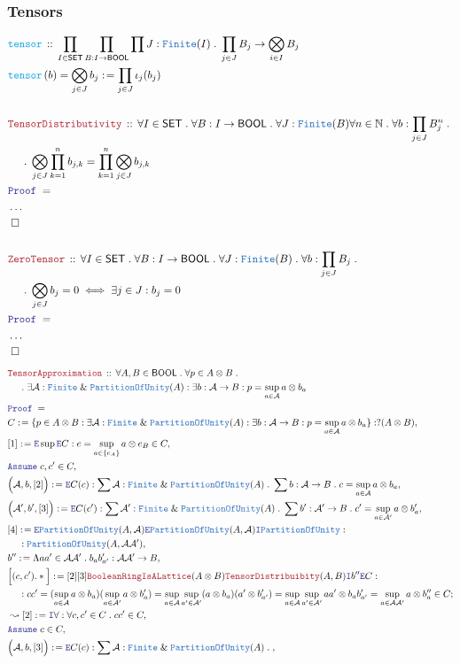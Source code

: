 \documentclass[12pt]{scrartcl}
\newcommand{\TYPE}[1]{\textcolor{NavyBlue}{\mathtt{#1}}}
\newcommand{\FUNC}[1]{\textcolor{Cerulean}{\mathtt{#1}}}
\newcommand{\LOGIC}[1]{\textcolor{Blue}{\mathtt{#1}}}
\newcommand{\THM}[1]{\textcolor{Maroon}{\mathtt{#1}}}
\renewcommand{\.}{\; . \;}
\newcommand{\de}{: \kern 0.1pc =}
\newcommand{\Act}[1]{\left( #1 \right)}
\newcommand{\Theorem}[2]{& \THM{#1} \, :: \, #2 \\ & \Proof = \\ }
\newcommand{\DeclareFunc}[2]{& \FUNC{#1} \, :: \, #2 \\}
\newcommand{\DefineNamedFunc}[4]{&  \FUNC{#1}\Act{#2} = #3 \de #4 \\}
\newcommand{\NewLine}{\\ & \kern 1pc}
\newcommand{\Page}[1]{ \begin{align*} #1 \end{align*}   }
\newcommand{\NoProof}{ & \ldots \\ \EndProof}
\renewcommand{\And}{\; \& \;}
\newcommand{\Intro}{\LOGIC{I}}
\newcommand{\Elim}{\LOGIC{E}}
\newcommand{\Nat}{\mathbb{N} }
\newcommand{\Say}[3]{& #1 \de #2 : #3, \\}
\newcommand{\Conclude}[3]{& #1 \de #2 : #3; \\}
\newcommand{\Derive}[3]{& \leadsto #1 \de #2 : #3, \\}
\newcommand{\AssumeIn}[2]{& \LOGIC{Assume} \; #1 \in #2, \\}
\newcommand{\QED}{\; \square}
\newcommand{\EndProof}{& \QED \\}
\newcommand{\Proof}{\LOGIC{Proof} \; }
\newcommand{\Finite}{\TYPE{Finite}}
\newcommand{\A}{\mathcal{A}}
\newcommand{\SET}{\mathsf{SET}}
\newcommand{\PoU}{\TYPE{PartitionOfUnity}}
\newcommand{\BOOL}{\mathsf{BOOL}}
\begin{document}
\subsubsection{Tensors}
\Page{
	\DeclareFunc{tensor}
	{
		\prod_{I \in \SET} \prod_{B : I \to \BOOL}
		\prod J : \TYPE{Finite}(I) \.
		\prod_{j \in J} B_j \to \bigotimes_{i \in I} B_j
	}
	\DefineNamedFunc{tensor}{b}{\bigotimes_{j \in J} b_j}
	{ \prod_{j \in J} \iota_j(b_j)}
	\\
	\Theorem{TensorDistributivity}
	{
		\forall I \in \SET \.
		\forall B : I \to \BOOL \.
		\forall J : \TYPE{Finite}(B)
		\forall n \in \Nat \.
		\forall b : \prod_{j \in J} B^n_j \. \NewLine \.
		\bigotimes_{j\in J} \prod^n_{k=1} b_{j,k} =
		\prod^n_{k=1} \bigotimes_{j \in J} b_{j,k}
	}
	\NoProof
	\\
	\Theorem{ZeroTensor}
	{
		\forall I \in \SET \.
		\forall B : I \to \BOOL \.
		\forall J : \TYPE{Finite}(B) \.
		\forall b : \prod_{j \in J} B_j \.
		\NewLine \.		
		\bigotimes_{j \in J} b_j = 0
		\iff
		\exists j \in J : b_j = 0
	}
	\NoProof
}\Page{
	\Theorem{TensorApproximation}
	{
		\forall A,B \in \BOOL \.
		\forall p \in A \otimes B \.
		\NewLine \.
		\exists \A : \TYPE{Finite} \And \PoU(A) :
		\exists b : \A \to B :
		p = \sup_{a \in \A} a \otimes b_a
	}
	\Say{C}
	{
		\{
			p \in A \otimes B : 
			\exists \A : \TYPE{Finite} \And \PoU(A) :
			\exists b : \A \to B :
			p = \sup_{a \in \A} a \otimes b_a
		\}
	}
	{
		?(A \otimes B)
	}
	\Say{[1]}{\Elim \sup \Elim C}{e = \sup_{a \in \{e_A\}} a \otimes e_B \in C}
	\AssumeIn{c,c'}{C}
	\Say{\Big(\A,b,[2]\Big)}{\Elim C (c)}
	{
			\sum \A : \Finite \And \PoU(A) \.
			\sum b : \A \to B \.
			c = \sup_{a \in \A} a \otimes b_a	
	}
	\Say{\Big(\A',b',[3]\Big)}{\Elim C (c')}
	{
			\sum \A' : \Finite \And \PoU(A) \.
			\sum b' : \A' \to B \.
			c' = \sup_{a \in \A'} a \otimes b'_a	
	}
	\Say{[4]}{\Elim \PoU(A,\A)\Elim \PoU(A,\A)\Intro \PoU}
	{
		\NewLine :		
		\PoU(A,\A\A')
	}
	\Say{b''}{\Lambda aa' \in \A\A' \. b_ab'_{a'}}{\A\A' \to B}
	\Conclude{\Big[(c,c').*\Big]}
	{
		[2][3]
		\THM{BooleanRingIsALattice}(A \otimes B)
		\THM{TensorDistribuibity}(A,B)
		\Intro b''	
		\Elim C
	}
	{
		\NewLine :		
		cc' =
		(\sup_{a \in \A} a \otimes b_a)(\sup_{a \in \A'} a \otimes b'_a) =
		\sup_{a \in \A} \sup_{a' \in \A'}  (a \otimes b_a)(a' \otimes b'_{a'}) =
		\sup_{a \in \A} \sup_{a' \in \A'}  aa' \otimes b_a b'_{a'} =
		\sup_{a \in \A\A'} a \otimes b''_a 
		\in C
	}
	\Derive{[2]}{\Intro \forall}{\forall c,c' \in C \. cc' \in C}
	\AssumeIn{c}{C}
	\Say{\Big(\A,b,[3]\Big)}{\Elim C (c)}
	{
			\sum \A : \Finite \And \PoU(A) \.
}}
\end{document}
